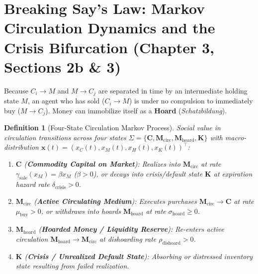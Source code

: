 \documentclass[11pt,a4paper]{article}
\newtheorem{definition}{Definition}[section]
\begin{document}
\section{Breaking Say's Law: Markov Circulation Dynamics and the Crisis Bifurcation (Chapter 3, Sections 2b \& 3)}

Because $C_i \to M$ and $M \to C_j$ are separated in time by an intermediate holding state $M$, an agent who has sold ($C_i \to M$) is under no compulsion to immediately buy ($M \to C_j$). Money can immobilize itself as a \textbf{Hoard} (\textit{Schatzbildung}).

\begin{definition}[Four-State Circulation Markov Process]
Social value in circulation transitions across four states $\Sigma = \{\mathbf{C}, \mathbf{M}_{\text{circ}}, \mathbf{M}_{\text{hoard}}, \mathbf{K}\}$ with macro-distribution $\mathbf{x}(t) = (x_C(t), x_M(t), x_H(t), x_K(t))^\top$:
\begin{enumerate}[label=(\arabic*)]
    \item $\mathbf{C}$ (\textbf{Commodity Capital on Market}): Realizes into $\mathbf{M}_{\text{circ}}$ at rate $\gamma_{\text{sale}}(x_M) = \beta x_M$ ($\beta > 0$), or decays into crisis/default state $\mathbf{K}$ at expiration hazard rate $\delta_{\text{crisis}} > 0$.
    \item $\mathbf{M}_{\text{circ}}$ (\textbf{Active Circulating Medium}): Executes purchases $\mathbf{M}_{\text{circ}} \to \mathbf{C}$ at rate $\mu_{\text{buy}} > 0$, or withdraws into hoards $\mathbf{M}_{\text{hoard}}$ at rate $\sigma_{\text{hoard}} \ge 0$.
    \item $\mathbf{M}_{\text{hoard}}$ (\textbf{Hoarded Money / Liquidity Reserve}): Re-enters active circulation $\mathbf{M}_{\text{hoard}} \to \mathbf{M}_{\text{circ}}$ at dishoarding rate $\rho_{\text{dishoard}} > 0$.
    \item $\mathbf{K}$ (\textbf{Crisis / Unrealized Default State}): Absorbing or distressed inventory state resulting from failed realization.
\end{enumerate}
\end{definition}
\end{document}
